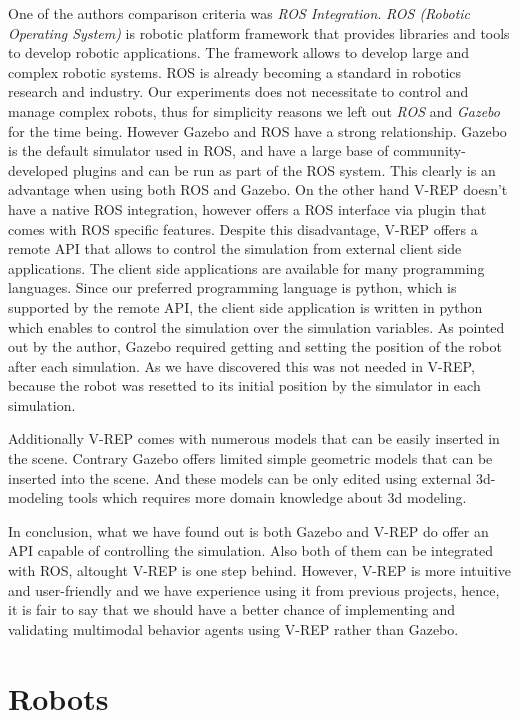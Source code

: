 \documentclass[format=acmsmall, review=false, screen=true]{acmart}
\begin{document}
One of the authors comparison criteria was \emph{ROS Integration}\cite{quigley2009ros}. \emph{ROS (Robotic Operating System)} is robotic platform framework that provides libraries and tools to develop robotic applications. The framework allows to develop large and complex robotic systems. ROS is already becoming a standard in robotics research and industry. Our experiments does not necessitate to control and manage complex robots, thus for simplicity reasons we left out \emph{ROS} and \emph{Gazebo} for the time being. However Gazebo and ROS have a strong relationship. Gazebo is the default simulator used in ROS, and have a large base of community-developed plugins and can be run as part of the ROS system. This clearly is an advantage when using both ROS and Gazebo. On the other hand V-REP doesn't have a native ROS integration, however offers a  ROS interface via plugin that comes with ROS specific features. Despite this disadvantage, V-REP offers a remote API that allows to control the simulation from external client side applications. The client side applications are available for many programming languages. Since our preferred programming language is python, which is supported by the remote API, the client side application is written in python which enables to control the simulation over the simulation variables. As pointed out by the author, Gazebo required getting and setting the position of the robot after each simulation. As we have discovered this was not needed in V-REP, because the robot was resetted to its initial position by the simulator in each simulation.

Additionally V-REP comes with numerous models that can be easily inserted in the scene. Contrary Gazebo offers limited simple geometric models that can be inserted into the scene. And these models can be only edited using external 3d-modeling tools which requires more domain knowledge about 3d modeling.

In conclusion, what we have found out is both Gazebo and V-REP do offer an API capable of controlling the simulation. Also both of them can be integrated with ROS, altought V-REP is one step behind. However, V-REP is more intuitive and user-friendly and we have experience using it from previous projects, hence, it is fair to say that we should have a better chance of implementing and validating multimodal behavior agents using V-REP rather than Gazebo.

\section{Robots}
\end{document}
